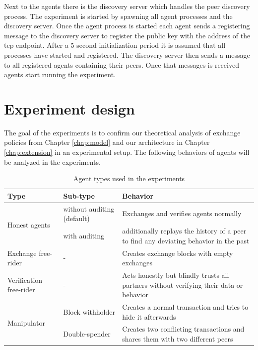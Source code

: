 Next to the agents there is the discovery server which handles the peer discovery process. The 
experiment is started by spawning all agent processes and the discovery server. Once the agent 
process is started each agent sends a registering message to the discovery server to register the 
public key with the address of the tcp endpoint. After a 5 second initialization period it is assumed
that all processes have started and registered. The discovery server then sends a message to all 
registered agents containing their peers. Once that messages is received agents start running the
experiment. 

\section{Experiment design}
The goal of the experiments is to confirm our theoretical analysis of exchange policies from Chapter 
\ref{chap:model} and our architecture in Chapter \ref{chap:extension} in an experimental setup.
The following behaviors of agents will be analyzed in the experiments.

\begin{table}
    \caption{Agent types used in the experiments}
    \label{tab:agent_types}
    \begin{tabular}{p{3cm}|p{3cm}|p{8cm}} \toprule
    \textbf{Type} & \textbf{Sub-type} & \textbf{Behavior} \\ \midrule
    \multirow{2}{3cm}{Honest agents} & without auditing (default) & Exchanges and verifies agents normally \\ \cline{2-3}
    & with auditing & additionally replays the history of a peer to find any deviating behavior in the past \\ \midrule
    Exchange free-rider & - & Creates exchange blocks with empty exchanges \\ 
    \midrule
    Verification free-rider & - & Acts honestly but blindly trusts all partners without verifying their data or behavior \\ \midrule
    \multirow{2}{3cm}{Manipulator } & Block withholder & Creates a normal transaction and tries to hide it afterwards \\ \cline{2-3}
    & Double-spender & Creates two conflicting transactions and shares them with two different peers \\ \bottomrule
    \end{tabular}
\end{table}

